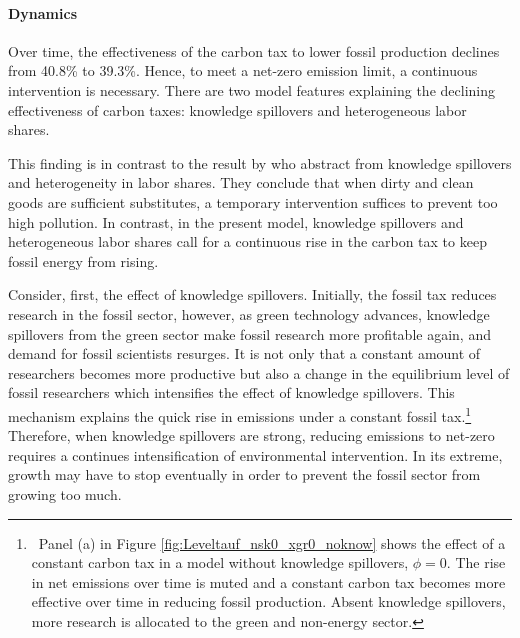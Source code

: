 \paragraph{Dynamics}

Over time, the effectiveness of the carbon tax to lower fossil production declines from 40.8\% to 39.3\%. Hence, to meet a net-zero emission limit, a continuous intervention is necessary. There are two model features explaining the declining effectiveness of carbon taxes: knowledge spillovers and heterogeneous labor shares.  

This finding is in contrast to the result by \cite{Acemoglu2012TheChange} who abstract from knowledge spillovers and heterogeneity in labor shares. They conclude that when dirty and clean goods are sufficient substitutes, a temporary intervention suffices to prevent too high pollution. In contrast, in the present model, knowledge spillovers and heterogeneous labor shares 
call for a continuous rise in the carbon tax to keep fossil energy from rising. 

Consider, first, the effect of knowledge spillovers.
Initially, the fossil tax reduces research in the fossil sector, however, as green technology advances, knowledge spillovers from the green sector make fossil research more profitable again, and demand for fossil scientists resurges.
It is not only that a constant amount of researchers becomes more productive but also a change in the equilibrium level of fossil researchers which intensifies the effect of knowledge spillovers. This mechanism explains the quick rise in emissions under a constant fossil tax.\footnote{\ Panel (a) in Figure \ref{fig:Leveltauf_nsk0_xgr0_noknow} shows the effect of a constant carbon tax in a model without knowledge spillovers, $\phi=0$. The rise in net emissions over time is muted and a constant carbon tax becomes more effective over time in reducing fossil production.  Absent knowledge spillovers, more research is allocated to the green and non-energy sector.} 
Therefore, when knowledge spillovers are strong, reducing emissions to net-zero requires a continues intensification of environmental intervention. In its extreme, growth may have to stop eventually in order to prevent the fossil sector from growing too much.

